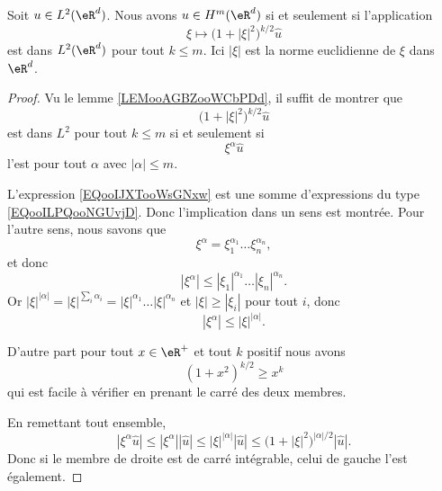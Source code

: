\begin{lemma}
    Soit \( u\in L^2(\eR^d)\). Nous avons \( u\in H^m(\eR^d)\) si et seulement si l'application
    \begin{equation}
        \xi\mapsto \big( 1+| \xi |^2 \big)^{k/2}\hat u
    \end{equation}
    est dans \( L^2(\eR^d)\) pour tout \( k\leq m\). Ici \( | \xi |\) est la norme euclidienne de \( \xi\) dans \( \eR^d\).
\end{lemma}

\begin{proof}
    Vu le lemme \ref{LEMooAGBZooWCbPDd}, il suffit de montrer que 
    \begin{equation}        \label{EQooIJXTooWsGNxw}
        \big( 1+| \xi |^2 \big)^{k/2}\hat u
    \end{equation}
    est dans \( L^2\) pour tout \( k\leq m\) si et seulement si 
    \begin{equation}        \label{EQooILPQooNGUvjD}
        \xi^{\alpha}\hat u
    \end{equation}
    l'est pour tout \( \alpha\) avec \( | \alpha |\leq m\).

    L'expression \eqref{EQooIJXTooWsGNxw} est une somme d'expressions du type \eqref{EQooILPQooNGUvjD}. Donc l'implication dans un sens est montrée. Pour l'autre sens, nous savons que
    \begin{equation}
        \xi^{\alpha}=\xi_1^{\alpha_1}\ldots \xi_n^{\alpha_n},
    \end{equation}
    et donc 
    \begin{equation}
        | \xi^{\alpha} |\leq | \xi_1 |^{\alpha_1}\ldots | \xi_n |^{\alpha_n}.
    \end{equation}
    Or \( | \xi |^{| \alpha |}=| \xi |^{\sum_i\alpha_i}=| \xi |^{\alpha_1}\ldots | \xi |^{\alpha_n}\) et \( | \xi |\geq | \xi_i |\) pour tout \( i\), donc
    \begin{equation}
        | \xi^{\alpha} |\leq | \xi |^{| \alpha |}.
    \end{equation}
    
    D'autre part pour tout \( x\in \eR^+\) et tout \( k\) positif nous avons
    \begin{equation}
        (1+x^2)^{k/2}\geq x^k
    \end{equation}
    qui est facile à vérifier en prenant le carré des deux membres.

    En remettant tout ensemble,
    \begin{equation}
        | \xi^{\alpha}\hat u |\leq | \xi^{\alpha} | |\hat u |\leq | \xi |^{| \alpha |}| \hat u |\leq \big( 1+| \xi |^2 \big)^{| \alpha |/2}| \hat u |.
    \end{equation}
    Donc si le membre de droite est de carré intégrable, celui de gauche l'est également.
\end{proof}

